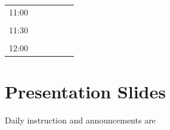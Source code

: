 \documentclass[a4paper]{article}
\begin{document}
\begin{table}[ht!]
{\begin{tabular}{|c|c|c|c|c|c|}
					11:00         &                                                                                          &                                                                    &                                                                      &                                                                     &                                                                   \\
					&                                                                                          &                                                                    &                                                                      &                                                                     &                                                                   \\
					11:30         &                                                                                          &                                                                    &                                                                      &                                                                     &                                                                   \\
					&                                                                                          &                                                                    &                                                                      &                                                                     &                                                                   \\
					12:00         &                                                                                          &                                                                    &                                                                      &                                                                     &                                                                   \\ \hline
				\end{tabular}%
			}
		\end{table}

	\section{Presentation Slides}
	
		Daily instruction and announcements are 
\end{document}
